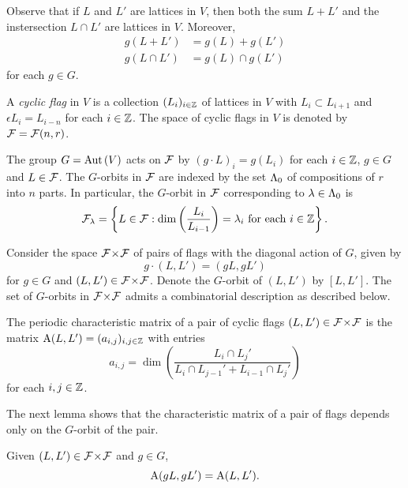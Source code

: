 \documentclass[a4paper, 11pt]{report}
\begin{document}
Observe that if $L$ and $L'$ are lattices in $V$, then both the sum $L+L'$ and the instersection $L\cap L'$ are lattices in $V$. Moreover,
\begin{align*}
g(L+L') &= g(L) + g(L')\\
g(L\cap L') &= g(L)\cap g(L')
\end{align*}
for each $g\in G$.

\begin{definition}\label{definition:cyclic-flags}
A \emph{cyclic flag} in $V$ is a collection $(L_i)_{i\in\mathbb{Z}}$ of lattices in $V$ with $L_i\subset L_{i+1}$ and $\epsilon L_i = L_{i-n}$ for each $i\in\mathbb{Z}$. The space of cyclic flags in $V$ is denoted by $\mathcal{F}=\mathcal{F}(n,r)$.
\end{definition}

The group $G=\operatorname{Aut}{(V)}$ acts on $\mathcal{F}$ by $(g\cdot L)_i = g(L_i)$ for each $i\in\mathbb{Z}$, $g\in G$ and $L\in\mathcal{F}$. The $G$-orbits in $\mathcal{F}$ are indexed by the set $\Lambda_0{}$ of compositions of $r$ into $n$ parts. In particular, the $G$-orbit in $\mathcal{F}$ corresponding to $\lambda\in\Lambda_0{}$ is
\begin{equation*}
\mathcal{F}_\lambda = \left\{L\in\mathcal{F}: \dim\left(\frac{L_i}{L_{i-1}}\right) = \lambda_i \text{ for each } i\in\mathbb{Z}\right\}.
\end{equation*}

Consider the space ${\mathcal{F}\!\times\!\mathcal{F}}$ of pairs of flags with the diagonal action of $G$, given by
\begin{equation*}
g\cdot(L,L') = (gL,gL')
\end{equation*}
for $g\in G$ and $(L,L')\in{\mathcal{F}\!\times\!\mathcal{F}}$. Denote the $G$-orbit of $(L,L')$ by $[L,L']$. The set of $G$-orbits in ${\mathcal{F}\!\times\!\mathcal{F}}$ admits a combinatorial description as described below.

\begin{definition}\label{def:characteristic-matrix}
The periodic characteristic matrix of a pair of cyclic flags $(L,L')\in{\mathcal{F}\!\times\!\mathcal{F}}$ is the matrix $\operatorname{A}(L,L')=(a_{i,j})_{i,j\in\mathbb{Z}}$ with entries
\begin{equation*}
a_{i,j} = \dim\left(\frac{L_i\cap L_j'}{L_i\cap L_{j-1}' + L_{i-1}\cap L_j'}\right)
\end{equation*}
for each $i,j\in\mathbb{Z}$.
\end{definition}

The next lemma shows that the characteristic matrix of a pair of flags depends only on the $G$-orbit of the pair.
\begin{lemma}
Given $(L,L')\in{\mathcal{F}\!\times\!\mathcal{F}}$ and $g\in G$,
\begin{equation*}
\operatorname{A}(gL,gL') = \operatorname{A}(L,L').
\end{equation*}
\end{lemma}
\end{document}
